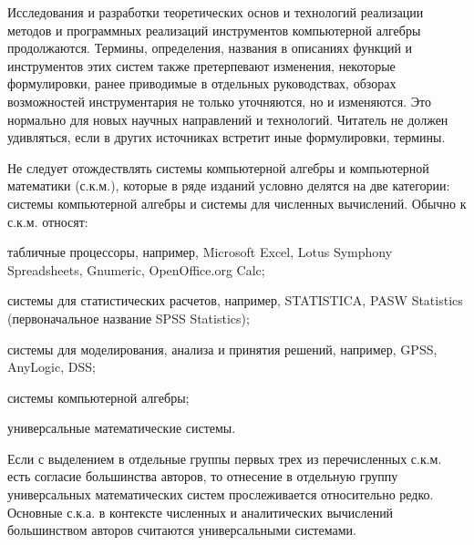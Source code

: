 Исследования и разработки теоретических основ и технологий реализации методов и программных реализаций инструментов компьютерной алгебры продолжаются. Термины, определения, названия в описаниях функций и инструментов этих систем также претерпевают изменения, некоторые формулировки, ранее приводимые в отдельных руководствах, обзорах возможностей инструментария не только уточняются, но и изменяются. Это нормально для новых научных направлений и технологий. Читатель не должен удивляться, если в других источниках встретит иные формулировки, термины.

Не следует отождествлять системы компьютерной алгебры и компьютерной математики (с.к.м.), которые в ряде изданий условно делятся на две категории: системы компьютерной алгебры и системы для численных вычислений. Обычно к с.к.м. относят:
\begin{textitemize}
	\item табличные процессоры, например, Microsoft Excel, Lotus Symphony Spreadsheets, Gnumeric, OpenOffice.org Calc;
	\item системы для статистических расчетов, например, STATISTICA, PASW Statistics (первоначальное название SPSS Statistics);
	\item системы для моделирования, анализа и принятия решений, например, GPSS, AnyLogic, DSS;
	\item системы компьютерной алгебры;
	\item универсальные математические системы.
\end{textitemize}

Если с выделением в отдельные группы первых трех из перечисленных с.к.м. есть согласие большинства авторов, то отнесение в отдельную группу универсальных математических систем прослеживается относительно редко. Основные с.к.а. в контексте численных и аналитических вычислений большинством авторов считаются универсальными системами.

